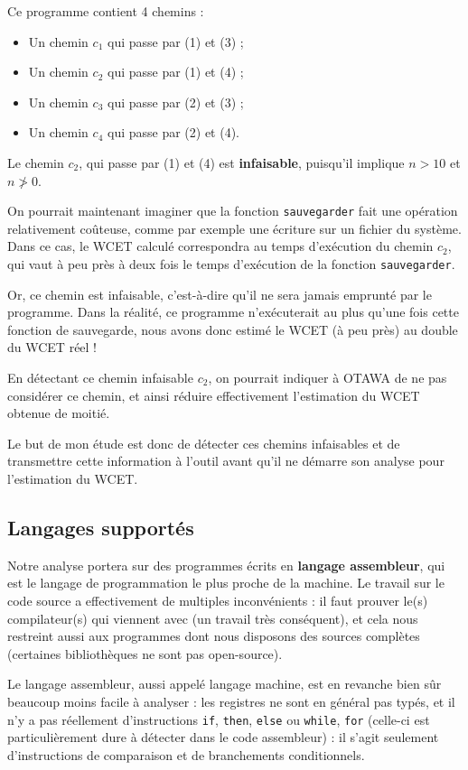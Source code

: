 \documentclass[french]{article}
\begin{document}
  Ce programme contient 4 chemins :
  \begin{itemize}
    \item Un chemin $c_1$ qui passe par (1) et (3) ;
    \item Un chemin $c_2$ qui passe par (1) et (4) ;
    \item Un chemin $c_3$ qui passe par (2) et (3) ;
    \item Un chemin $c_4$ qui passe par (2) et (4).
  \end{itemize}

  Le chemin $c_2$, qui passe par (1) et (4) est \textbf{infaisable}, puisqu'il implique $n > 10$ et $n \ngtr 0$.

  On pourrait maintenant imaginer que la fonction \texttt{sauvegarder} fait une opération relativement coûteuse, comme par exemple une écriture sur un fichier du système. Dans ce cas, le WCET calculé correspondra au temps d'exécution du chemin $c_2$, qui vaut à peu près à deux fois le temps d'exécution de la fonction \texttt{sauvegarder}.

  Or, ce chemin est infaisable, c'est-à-dire qu'il ne sera jamais emprunté par le programme. Dans la réalité, ce programme n'exécuterait au plus qu'une fois cette fonction de sauvegarde, nous avons donc estimé le WCET (à peu près) au double du WCET réel !

  En détectant ce chemin infaisable $c_2$, on pourrait indiquer à OTAWA de ne pas considérer ce chemin, et ainsi réduire effectivement l'estimation du WCET obtenue de moitié.

  Le but de mon étude est donc de détecter ces chemins infaisables et de transmettre cette information à l'outil avant qu'il ne démarre son analyse pour l'estimation du WCET.


  \subsection{Langages supportés}
  Notre analyse portera sur des programmes écrits en \textbf{langage assembleur}, qui est le langage de programmation le plus proche de la machine. Le travail sur le code source a effectivement de multiples inconvénients : il faut prouver le(s) compilateur(s) qui viennent avec (un travail très conséquent), et cela nous restreint aussi aux programmes dont nous disposons des sources complètes (certaines bibliothèques ne sont pas open-source).

  Le langage assembleur, aussi appelé langage machine, est en revanche bien sûr beaucoup moins facile à analyser : les registres ne sont en général pas typés, et il n'y a pas réellement d'instructions \texttt{if}, \texttt{then}, \texttt{else} ou \texttt{while}, \texttt{for} (celle-ci est particulièrement dure à détecter dans le code assembleur) : il s'agit seulement d'instructions de comparaison et de branchements conditionnels.
\end{document}
